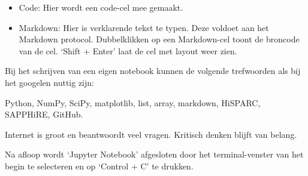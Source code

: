 \begin{itemize}
\item Code: Hier wordt een code-cel mee gemaakt.
\item Markdown: Hier is verklarende tekst te typen. Deze voldoet aan het Markdown protocol. Dubbelklikken op een Markdown-cel
toont de broncode van de cel. `Shift + Enter' laat de cel met layout weer zien.
\end{itemize}

Bij het schrijven van een eigen notebook kunnen de volgende trefwoorden als bij het googelen nuttig zijn:

Python, NumPy, SciPy, matplotlib, list, array, markdown, HiSPARC, SAPPHiRE, GitHub.

Internet is groot en beantwoordt veel vragen. Kritisch denken blijft van belang.

Na afloop wordt `Jupyter Notebook' afgesloten door
het terminal-venster van het begin te selecteren en op `Control + C' te drukken.


